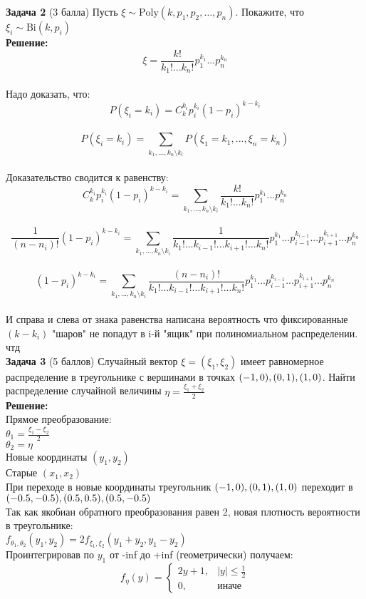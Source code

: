 \documentclass{article}
\begin{document}
\textbf{Задача 2} (3 балла)
Пусть $\xi \sim \mathrm{Poly}(k, p_1, p_2, \dots, p_n)$. Покажите, что $\xi_i \sim \mathrm{Bi}(k, p_i)$
\\


\textbf{Решение:}\\
$$\xi = \frac{k!}{k_1!...k_n!}p_1^{k_1}...p_n^{k_n}$$\\
Надо доказать, что:\\
$$P(\xi_i = k_i) = C_k^{k_i}p_i^{k_i}(1-p_i)^{k-k_i}$$\\
$$P(\xi_i = k_i) = \sum\limits_{k_1,...,k_n\setminus k_i}P(\xi_1 = k_1, ..., \xi_n = k_n)$$\\
Доказательство сводится к равенству:\\
$$C_k^{k_i}p_i^{k_i}(1-p_i)^{k-k_i} = \sum\limits_{k_1,...,k_n\setminus k_i}\frac{k!}{k_1!...k_n!}p_1^{k_1}...p_n^{k_n}$$\\
$$\frac{1}{(n-n_i)!}(1-p_i)^{k-k_i} = \sum\limits_{k_1,...,k_n\setminus k_i}\frac{1}{k_1!...k_{i-1}!...k_{i+1}!...k_n!}p_1^{k_1}...p_{i-1}^{k_{i-1}}...p_{i+1}^{k_{i+1}}...p_n^{k_n}$$\\
$$(1-p_i)^{k-k_i} = \sum\limits_{k_1,...,k_n\setminus k_i}\frac{(n-n_i)!}{k_1!...k_{i-1}!...k_{i+1}!...k_n!}p_1^{k_1}...p_{i-1}^{k_{i-1}}...p_{i+1}^{k_{i+1}}...p_n^{k_n}$$\\
И справа и слева от знака равенства написана вероятность что фиксированные $(k - k_i)$ "шаров" не попадут в i-й "ящик" при полиномиальном распределении.\\
чтд\\

\textbf{Задача 3} (5 баллов)
Случайный вектор $\xi = (\xi_1, \xi_2)$ имеет равномерное распределение в треугольнике с вершинами в точках $(-1, 0), \space (0, 1), \space (1, 0)$. Найти распределение случайной величины $\eta =\frac{\xi_1 + \xi_2}{2}$ 
\\


\textbf{Решение:}\\
Прямое преобразование:\\
$\theta_1 = \frac{\xi_1-\xi_2}{2}$\\
$\theta_2=\eta$\\
Новые координаты $(y_1, y_2)$\\
Старые $(x_1, x_2)$\\
При переходе в новые координаты треугольник $(-1, 0), \space (0, 1), \space (1, 0)$ переходит в $(-0.5, -0.5), \space (0.5, 0.5), \space (0.5, -0.5)$\\

Так как якобиан обратного преобразования равен 2, новая плотность вероятности в треугольнике:\\
$f_{\theta_1,\theta_2}(y_1,y_2) = 2f_{\xi_1,\xi_2}(y_1+y_2,y_1-y_2)$\\
Проинтегрировав по $y_1$ от -inf до +inf (геометрически) получаем:\\
 \begin{equation*}
 f_{\eta}(y) = 
 \begin{cases}
   2y+1, & |y|\leq \frac{1}{2}\\
   0, & \text{иначе}
 \end{cases}
\end{equation*}
\end{document}

